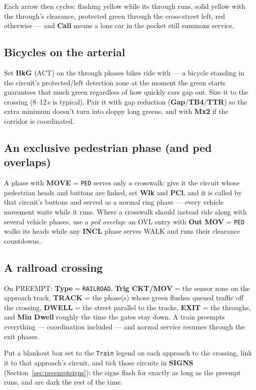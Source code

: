 \documentclass[11pt]{article}
\newcommand{\field}[1]{\textsf{\textbf{#1}}}
\newcommand{\screen}[1]{\textsc{#1}}
\begin{document}
Each arrow then cycles: flashing yellow while its through runs, solid yellow with
the through's clearance, protected green through the cross-street left, red
otherwise — and \field{Call} means a lone car in the pocket still summons
service.

\subsection{Bicycles on the arterial}

Set \field{BkG} (\screen{ACT}) on the through phases bikes ride with — a bicycle
standing in the circuit's protected/left detection zone at the moment the green
starts guarantees that much green regardless of how quickly cars gap out. Size it
to the crossing (8--12\,s is typical). Pair it with gap reduction
(\field{Gap}/\field{TB4}/\field{TTR}) so the extra minimum doesn't turn into
sloppy long greens, and with \field{Mx2} if the corridor is coordinated.

\subsection{An exclusive pedestrian phase (and ped overlaps)}

A phase with \field{MOVE} = \texttt{PED} serves only a crosswalk: give it the
circuit whose pedestrian heads and buttons are linked, set \field{Wlk} and
\field{PCl}, and it is called by that circuit's buttons and served as a normal
ring phase — every vehicle movement waits while it runs. Where a crosswalk should
instead ride along with several vehicle phases, use a \emph{ped overlap}: an OVL
entry with \field{Out MOV} = \texttt{PED} walks its heads while any \field{INCL}
phase serves WALK and runs their clearance countdowns.

\subsection{A railroad crossing}

On \screen{PREEMPT}: \field{Type} = \texttt{RAILROAD}, \field{Trig CKT/MOV} = the
sensor zone on the approach track, \field{TRACK} = the phase(s) whose green
flushes queued traffic off the crossing, \field{DWELL} = the street parallel to
the tracks, \field{EXIT} = the throughs, and \field{Min Dwell} roughly the time
the gates stay down. A train preempts everything — coordination included — and
normal service resumes through the exit phases.

Put a blankout box set to the \texttt{Train} legend on each approach to the
crossing, link it to that approach's circuit, and tick those circuits in
\field{SIGNS} (Section~\ref{sec:preemptsigns}): the signs flash for exactly as long
as the preempt runs, and are dark the rest of the time.
\end{document}
